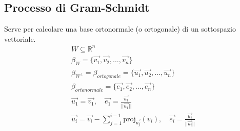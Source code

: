 \documentclass[10pt]{extarticle}
\begin{document}
\subsection{Processo di Gram-Schmidt}
Serve per calcolare una base ortonormale (o ortogonale) di un sottospazio vettoriale.
\begin{align*}
    W \subseteq \mathbb{R}^n \\
    \beta_W=\{\vec{v_1},\vec{v_2},\dots,\vec{v_n}\} \\
    \beta_{W^{\bot}}=\beta_{ortogonale}=\{\vec{u_1},\vec{u_2},\dots,\vec{u_n}\} \\
    \beta_{ortonormale}=\{\vec{e_1},\vec{e_2},\dots,\vec{e_n}\} \\
    \vec{u_1}=\vec{v_1}, \quad \vec{e_1}=\frac{\vec{u_1}}{|| \vec{u_1} ||} \\
    \vec{u_i}=\vec{v_i}-\sum_{j=1}^{i-1} \text{proj}_{\vec{u_j}}(v_i), \quad \vec{e_i}=\frac{\vec{u_i}}{||\vec{u_i}||}
\end{align*}
\end{document}

